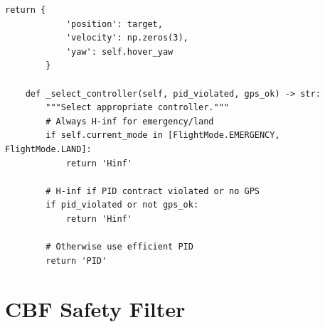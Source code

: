 \begin{lstlisting}[caption={Flight mode supervisor (flight\_mode\_supervisor.py)}, label=lst:supervisor]
        return {
            'position': target,
            'velocity': np.zeros(3),
            'yaw': self.hover_yaw
        }

    def _select_controller(self, pid_violated, gps_ok) -> str:
        """Select appropriate controller."""
        # Always H-inf for emergency/land
        if self.current_mode in [FlightMode.EMERGENCY, FlightMode.LAND]:
            return 'Hinf'

        # H-inf if PID contract violated or no GPS
        if pid_violated or not gps_ok:
            return 'Hinf'

        # Otherwise use efficient PID
        return 'PID'
\end{lstlisting}

\section{CBF Safety Filter}

